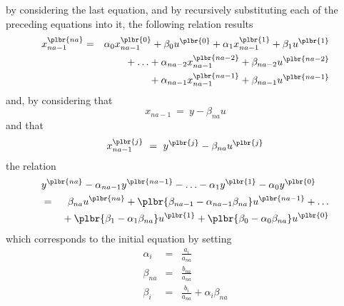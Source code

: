 \documentclass[12pt,fleqn]{article}
\begin{document}
by considering the last equation, and by recursively substituting each of
the preceding equations into it, the following relation results
\begin{eqnarray*}
    x_{na-1}^{\plbr{na}} & = & 
        \alpha_0 x_{na-1}^{\plbr{0}} + \beta_0 u^{\plbr{0}}
        + \alpha_1 x_{na-1}^{\plbr{1}} + \beta_1 u^{\plbr{1}} \\
	& & \mbox{} + {\ldots} 
	+ \alpha_{na-2} x_{na-1}^{\plbr{na-2}} + \beta_{na-2} u^{\plbr{na-2}} \\
	& & \mbox{}
	+ \alpha_{na-1} x_{na-1}^{\plbr{na-1}} + \beta_{na-1} u^{\plbr{na-1}}
\end{eqnarray*}
and, by considering that 
\begin{displaymath}
    x_{na-1} \ = \ y - \beta_{na} u
\end{displaymath}
and that
\begin{displaymath}
    x_{na-1}^{\plbr{j}} \ = \ y^{\plbr{j}} - \beta_{na} u^{\plbr{j}}
\end{displaymath}
the relation 
\begin{eqnarray*}
    \lefteqn{
        y^{\plbr{na}} - \alpha_{na-1} y^{\plbr{na-1}}
	- {\ldots} - \alpha_1 y^{\plbr{1}} - \alpha_0 y^{\plbr{0}}
    } \\
    & = & \beta_{na} u^{\plbr{na}} 
    + \plbr{\beta_{na-1}-\alpha_{na-1}\beta_{na}} u^{\plbr{na-1}} 
    + {\ldots} \\
    & & \mbox{}
    + \plbr{\beta_1-\alpha_1\beta_{na}} u^{\plbr{1}}
    + \plbr{\beta_0-\alpha_0\beta_{na}} u^{\plbr{0}}
\end{eqnarray*}
which corresponds to the initial equation by setting
\begin{eqnarray*}
    \alpha_i & = & \frac{a_i}{a_{na}} \\
    \beta_{na} & = & \frac{b_{na}}{a_{na}} \\
    \beta_i & = & \frac{b_i}{a_{na}} + \alpha_i \beta_{na}
\end{eqnarray*}
\end{document}
